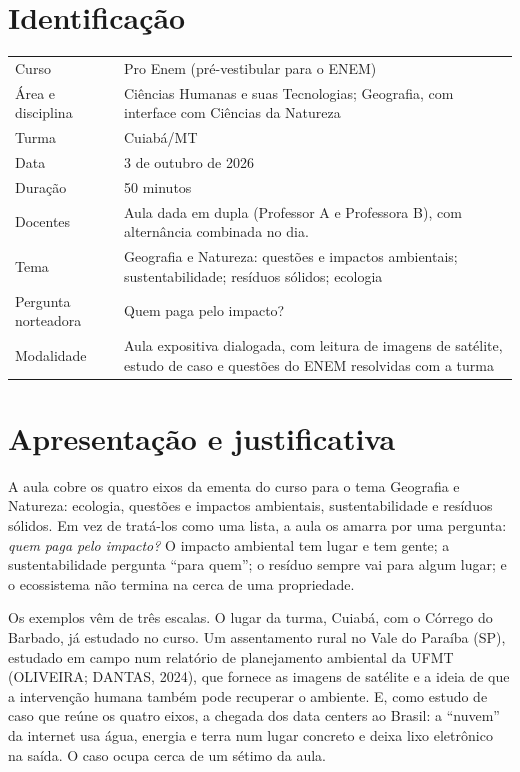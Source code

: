 \documentclass[11pt]{article}
\begin{document}
\blocotitulo

\section*{Identificação}
\begin{tabularx}{\linewidth}{@{}>{\sffamily\small\color{fgsoft}}l X@{}}
Curso & Pro Enem (pré-vestibular para o ENEM) \\
Área e disciplina & Ciências Humanas e suas Tecnologias; Geografia, com interface com Ciências da Natureza \\
Turma & Cuiabá/MT \\
Data & 3 de outubro de 2026 \\
Duração & 50 minutos \\
Docentes & Aula dada em dupla (Professor A e Professora B), com alternância combinada no dia. \\
Tema & Geografia e Natureza: questões e impactos ambientais; sustentabilidade; resíduos sólidos; ecologia \\
Pergunta norteadora & Quem paga pelo impacto? \\
Modalidade & Aula expositiva dialogada, com leitura de imagens de satélite, estudo de caso e questões do ENEM resolvidas com a turma \\
\end{tabularx}

\section{Apresentação e justificativa}
A aula cobre os quatro eixos da ementa do curso para o tema Geografia e Natureza: ecologia, questões e impactos
ambientais, sustentabilidade e resíduos sólidos. Em vez de tratá-los como uma lista, a aula os amarra por uma
pergunta: \emph{quem paga pelo impacto?} O impacto ambiental tem lugar e tem gente; a sustentabilidade pergunta
\enquote{para quem}; o resíduo sempre vai para algum lugar; e o ecossistema não termina na cerca de uma propriedade.

Os exemplos vêm de três escalas. O lugar da turma, Cuiabá, com o Córrego do Barbado, já estudado no curso. Um
assentamento rural no Vale do Paraíba (SP), estudado em campo num relatório de planejamento ambiental da UFMT
(OLIVEIRA; DANTAS, 2024), que fornece as imagens de satélite e a ideia de que a intervenção humana também pode
recuperar o ambiente. E, como estudo de caso que reúne os quatro eixos, a chegada dos data centers ao Brasil:
a \enquote{nuvem} da internet usa água, energia e terra num lugar concreto e deixa lixo eletrônico na saída.
O caso ocupa cerca de um sétimo da aula.
\end{document}
